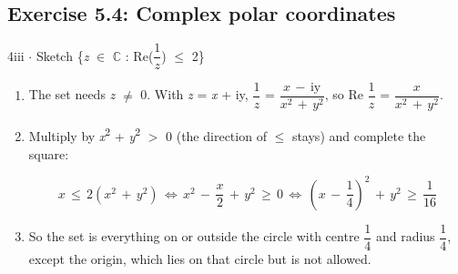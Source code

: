 \documentclass[11pt]{article}
\begin{document}
\begin{keepsection}
\end{keepsection}
\begin{keepsection}\subsection{Exercise 5.4: Complex polar coordinates}

\begin{workedbox}{4iii \ensuremath{\cdot} Sketch \{\textit{z} \ensuremath{\in} \ensuremath{\mathbb{C}} : Re({\small\ensuremath{\dfrac{1}{{z}}}}) \ensuremath{\leq} 2\}}
\begin{enumerate}
\item The set needs \textit{z} \ensuremath{\neq} 0. With \textit{z} = \textit{x} + iy, {\small\ensuremath{\dfrac{1}{{z}}}} = {\small\ensuremath{\dfrac{{x}\, -\, \text{iy}}{{x}^{2}\, +\, {y}^{2}}}}, so Re {\small\ensuremath{\dfrac{1}{{z}}}} = {\small\ensuremath{\dfrac{{x}}{{x}^{2}\, +\, {y}^{2}}}}.
\item {}
Multiply by \textit{x}\textsuperscript{2} + \textit{y}\textsuperscript{2} \ensuremath{>} 0 (the direction of \ensuremath{\leq} stays) and complete the square:

\begin{equation*}{x}\, \leq \, 2({x}^{2}\, +\, {y}^{2})\, \Leftrightarrow \, {x}^{2}\, -\, \dfrac{{x}}{2}\, +\, {y}^{2}\, \geq \, 0\, \Leftrightarrow \, \left({x}\, -\, \dfrac{1}{4}\right)^{2}\, +\, {y}^{2}\, \geq \, \dfrac{1}{16}\end{equation*}
\item {}
So the set is everything on or outside the circle with centre {\small\ensuremath{\dfrac{1}{4}}} and radius {\small\ensuremath{\dfrac{1}{4}}}, except the origin, which lies on that circle but is not allowed.


\end{enumerate}
\end{workedbox}
\end{keepsection}
\end{document}
